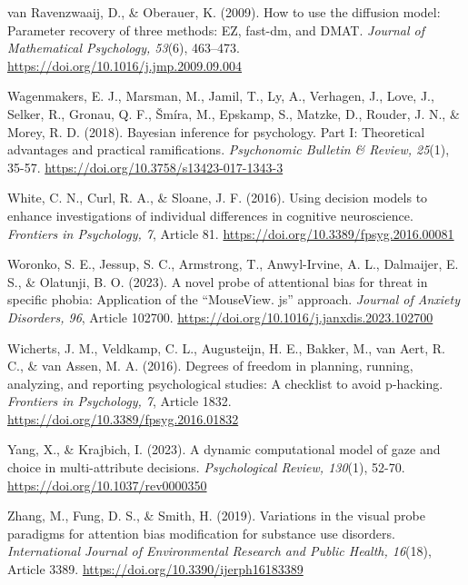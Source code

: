 \documentclass[authordate, reflection, issue]{jote-new-article}
\begin{document}
	van Ravenzwaaij, D., \& Oberauer, K. (2009). How to use the diffusion model: Parameter recovery of three methods: EZ, fast-dm, and DMAT. \emph{Journal of Mathematical Psychology, 53}(6), 463--473. \url{https://doi.org/10.1016/j.jmp.2009.09.004}



	Wagenmakers, E. J., Marsman, M., Jamil, T., Ly, A., Verhagen, J., Love, J., Selker, R., Gronau, Q. F., Šmíra, M., Epskamp, S., Matzke, D., Rouder, J. N., \& Morey, R. D. (2018). Bayesian inference for psychology. Part I: Theoretical advantages and practical ramifications. \emph{Psychonomic Bulletin \& Review, 25}(1), 35-57. \url{https://doi.org/10.3758/s13423-017-1343-3}



	White, C. N., Curl, R. A., \& Sloane, J. F. (2016). Using decision models to enhance investigations of individual differences in cognitive neuroscience. \emph{Frontiers in Psychology, 7}, Article 81. \url{https://doi.org/10.3389/fpsyg.2016.00081}



	Woronko, S. E., Jessup, S. C., Armstrong, T., Anwyl-Irvine, A. L., Dalmaijer, E. S., \& Olatunji, B. O. (2023). A novel probe of attentional bias for threat in specific phobia: Application of the “MouseView. js” approach. \emph{Journal of Anxiety Disorders, 96}, Article 102700. \url{https://doi.org/10.1016/j.janxdis.2023.102700}



	Wicherts, J. M., Veldkamp, C. L., Augusteijn, H. E., Bakker, M., van Aert, R. C., \& van Assen, M. A. (2016). Degrees of freedom in planning, running, analyzing, and reporting psychological studies: A checklist to avoid p-hacking. \emph{Frontiers in Psychology, 7}, Article 1832. \url{https://doi.org/10.3389/fpsyg.2016.01832}



	Yang, X., \& Krajbich, I. (2023). A dynamic computational model of gaze and choice in multi-attribute decisions. \emph{Psychological Review, 130}(1), 52-70. \url{https://doi.org/10.1037/rev0000350}



	Zhang, M., Fung, D. S., \& Smith, H. (2019). Variations in the visual probe paradigms for attention bias modification for substance use disorders. \emph{International Journal of Environmental Research and Public Health, 16}(18), Article 3389. \url{https://doi.org/10.3390/ijerph16183389}
\end{document}
